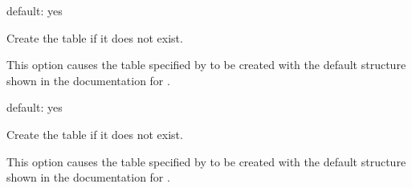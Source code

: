 \documentclass[letterpaper,10pt,english]{sphinxmanual}
\begin{document}
\begin{fulllineitems}
\label{\detokenize{mariadb-query-digest:cmdoption-mariadb-query-digest-1}}
default: yes

Create the {\hyperref[\detokenize{mariadb-query-digest:cmdoption-mariadb-query-digest-history}]{}} table if it does not exist.

This option causes the table specified by {\hyperref[\detokenize{mariadb-query-digest:cmdoption-mariadb-query-digest-history}]{}} to be created
with the default structure shown in the documentation for {\hyperref[\detokenize{mariadb-query-digest:cmdoption-mariadb-query-digest-history}]{}}.

\end{fulllineitems}


\begin{fulllineitems}
\label{\detokenize{mariadb-query-digest:cmdoption-mariadb-query-digest-2}}
default: yes

Create the {\hyperref[\detokenize{mariadb-query-digest:cmdoption-mariadb-query-digest-review}]{}} table if it does not exist.

This option causes the table specified by {\hyperref[\detokenize{mariadb-query-digest:cmdoption-mariadb-query-digest-review}]{}} to be created
with the default structure shown in the documentation for {\hyperref[\detokenize{mariadb-query-digest:cmdoption-mariadb-query-digest-review}]{}}.

\end{fulllineitems}
\end{document}
